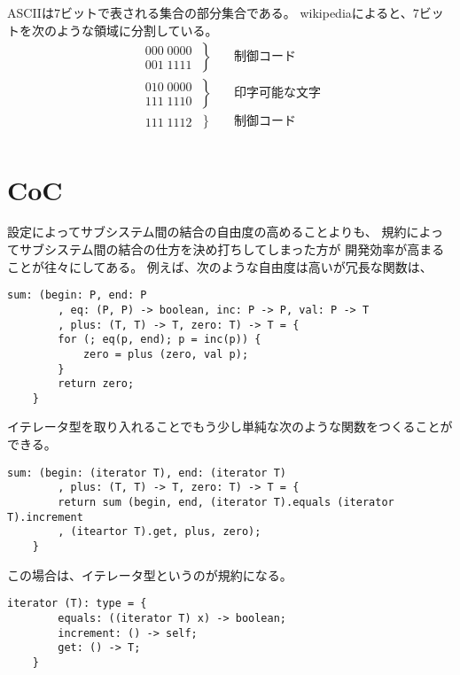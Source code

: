 {	ASCIIは$7$ビットで表される集合の部分集合である。
	wikipediaによると、$7$ビットを次のような領域に分割している。
	\begin{equation*}\begin{split}
		\left.\begin{split}
			000\;0000 \\
			001\;1111
		\end{split}\;\right\} & \quad\text{制御コード} \\
		\left.\begin{split}
			010\;0000 \\
			111\;1110
		\end{split}\;\right\} & \quad\text{印字可能な文字} \\
		\left.\begin{split}
			111\;1112
		\end{split}\;\right\} & \quad\text{制御コード} \\
	\end{split}\end{equation*}
\section{CoC}\label{s1:CoC} %
	設定によってサブシステム間の結合の自由度の高めることよりも、
	規約によってサブシステム間の結合の仕方を決め打ちしてしまった方が
	開発効率が高まることが往々にしてある。
	例えば、次のような自由度は高いが冗長な関数は、
	\begin{lstlisting}[caption=冗長な例, label=code:冗長な例]
	sum: (begin: P, end: P
		, eq: (P, P) -> boolean, inc: P -> P, val: P -> T
		, plus: (T, T) -> T, zero: T) -> T = {
		for (; eq(p, end); p = inc(p)) {
			zero = plus (zero, val p);
		}
		return zero;
	}
	\end{lstlisting}
	イテレータ型を取り入れることでもう少し単純な次のような関数をつくることが
	できる。
	\begin{lstlisting}[caption=単純化した例, label=code:単純化した例]
	sum: (begin: (iterator T), end: (iterator T)
		, plus: (T, T) -> T, zero: T) -> T = {
		return sum (begin, end, (iterator T).equals (iterator T).increment
		, (iteartor T).get, plus, zero);
	}
	\end{lstlisting}
	この場合は、イテレータ型というのが規約になる。
	\begin{lstlisting}[caption=イテレータ型, label=code:イテレータ型]
	iterator (T): type = {
		equals: ((iterator T) x) -> boolean;
		increment: () -> self;
		get: () -> T;
	}
	\end{lstlisting}
}
